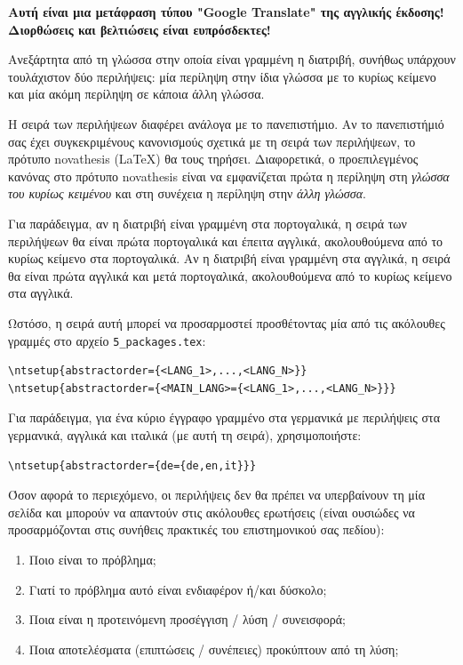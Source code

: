 
%

\textbf{Αυτή είναι μια μετάφραση τύπου "Google Translate" της αγγλικής έκδοσης! Διορθώσεις και βελτιώσεις είναι ευπρόσδεκτες!}

Ανεξάρτητα από τη γλώσσα στην οποία είναι γραμμένη η διατριβή, συνήθως υπάρχουν τουλάχιστον δύο περιλήψεις: μία περίληψη στην ίδια γλώσσα με το κυρίως κείμενο και μία ακόμη περίληψη σε κάποια άλλη γλώσσα.

Η σειρά των περιλήψεων διαφέρει ανάλογα με το πανεπιστήμιο.  Αν το πανεπιστήμιό σας έχει συγκεκριμένους κανονισμούς σχετικά με τη σειρά των περιλήψεων, το πρότυπο \gls{novathesis} (\LaTeX) θα τους τηρήσει.  Διαφορετικά, ο προεπιλεγμένος κανόνας στο πρότυπο \gls{novathesis} είναι να εμφανίζεται πρώτα η περίληψη στη \emph{γλώσσα του κυρίως κειμένου} και στη συνέχεια η περίληψη στην \emph{άλλη γλώσσα}.

Για παράδειγμα, αν η διατριβή είναι γραμμένη στα πορτογαλικά, η σειρά των περιλήψεων θα είναι πρώτα πορτογαλικά και έπειτα αγγλικά, ακολουθούμενα από το κυρίως κείμενο στα πορτογαλικά.  Αν η διατριβή είναι γραμμένη στα αγγλικά, η σειρά θα είναι πρώτα αγγλικά και μετά πορτογαλικά, ακολουθούμενα από το κυρίως κείμενο στα αγγλικά.

Ωστόσο, η σειρά αυτή μπορεί να προσαρμοστεί προσθέτοντας μία από τις ακόλουθες γραμμές στο αρχείο \verb+5_packages.tex+:

\begin{verbatim}
\ntsetup{abstractorder={<LANG_1>,...,<LANG_N>}}
\ntsetup{abstractorder={<MAIN_LANG>={<LANG_1>,...,<LANG_N>}}}
\end{verbatim}

Για παράδειγμα, για ένα κύριο έγγραφο γραμμένο στα γερμανικά με περιλήψεις στα γερμανικά, αγγλικά και ιταλικά (με αυτή τη σειρά), χρησιμοποιήστε:
\begin{verbatim}
\ntsetup{abstractorder={de={de,en,it}}}
\end{verbatim}

Όσον αφορά το περιεχόμενο, οι περιλήψεις δεν θα πρέπει να υπερβαίνουν τη μία σελίδα και μπορούν να απαντούν στις ακόλουθες ερωτήσεις (είναι ουσιώδες να προσαρμόζονται στις συνήθεις πρακτικές του επιστημονικού σας πεδίου):

\begin{enumerate}
\item Ποιο είναι το πρόβλημα;
\item Γιατί το πρόβλημα αυτό είναι ενδιαφέρον ή/και δύσκολο;
\item Ποια είναι η προτεινόμενη προσέγγιση / λύση / συνεισφορά;
\item Ποια αποτελέσματα (επιπτώσεις / συνέπειες) προκύπτουν από τη λύση;
\end{enumerate}


